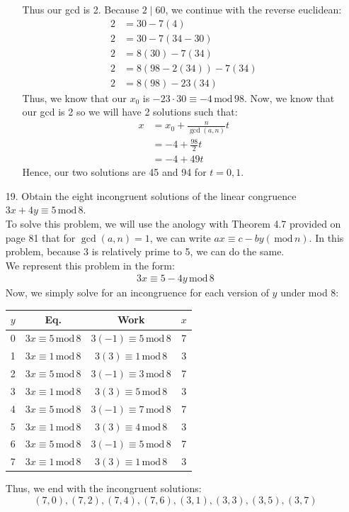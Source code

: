\documentclass[10pt,oneside]{book}
\newcommand{\gspc}{\vspace{0.13cm}} %
\newcommand{\gline}{\gspc\\} %
\newcommand{\gmod}{\,\text{mod}\,}
\begin{document}
\begin{enumerate}
\begin{enumerate}
		Thus our gcd is 2. Because $2\mid 60$, we continue with the reverse euclidean:
		\begin{align*}
			2&= 30 - 7(4)\\
			2&= 30 - 7(34 - 30)\\
			2&= 8(30) - 7(34)\\
			2&= 8(98 - 2(34)) - 7(34)\\
			2&= 8(98) - 23(34)
		\end{align*}
		Thus, we know that our $x_0$ is $-23\cdot 30\equiv -4\gmod 98$.
		\pagebreak
		Now, we know that our gcd is 2 so we will have 2 solutions such that:
		\begin{align*}
			x &= x_0 + \frac{n}{\gcd(a, n)}t \\
			&= -4 + \frac{98}{2}t\\
			&= -4 + 49t
		\end{align*}
		Hence, our two solutions are 45 and 94 for $t = 0, 1$. 
	\end{enumerate}
	\item [19.] Obtain the eight incongruent solutions of the linear congruence $3x + 4y \equiv 5\gmod 8$. \gline
	To solve this problem, we will use the anology with Theorem 4.7 provided on page 81 that for $\gcd(a,n)=1$, we can write $ax\equiv c - by(\gmod n)$. In this problem, because $3$ is relatively prime to 5, we can do the same.\gline
	We represent this problem in the form:
	\begin{align*}
		3x \equiv 5 - 4y\gmod 8
	\end{align*}
	Now, we simply solve for an incongruence for each version of $y$ under mod 8:
	\begin{center}
		\begin{tabular}{|c|c|c|c|}\hline
			$y$ & Eq. & Work& $x$ \\\hline
			0 & $3x\equiv 5\gmod 8$ & $3(-1)\equiv 5\gmod 8$ & 7\\\hline
			1 & $3x\equiv 1 \gmod 8$ & $3(3)\equiv 1 \gmod 8$ & 3\\\hline
			2 & $3x\equiv 5 \gmod 8$ & $3(-1)\equiv 3 \gmod 8$ & 7\\\hline
			3 & $3x\equiv 1\gmod 8$ & $3(3)\equiv 5 \gmod 8$ & 3\\\hline
			4 & $3x \equiv 5\gmod 8$ & $3(-1) \equiv 7\gmod 8$ & 7\\\hline
			5 & $3x \equiv 1 \gmod 8$ & $3(3)\equiv 4\gmod 8$ & 3\\\hline
			6 & $3x \equiv 5 \gmod 8$ & $3(-1)\equiv 5\gmod 8$ & 7\\\hline
			7 & $3x \equiv 1\gmod 8$ & $3(3)\equiv 1 \gmod 8$ & 3\\\hline
		\end{tabular}
	\end{center}
	Thus, we end with the incongruent solutions: 
	\[(7,0), (7,2), (7,4), (7,6), (3,1), (3,3), (3,5), (3,7)\]
\end{enumerate}
\end{document}
